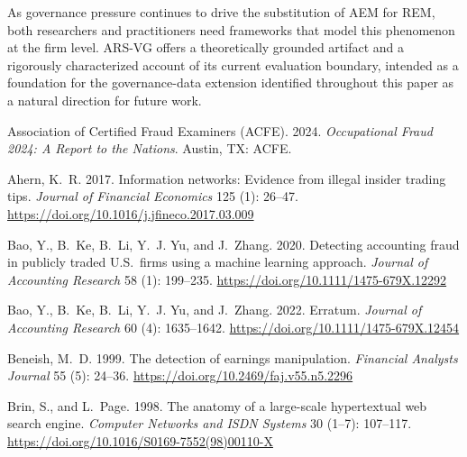 \documentclass[12pt]{article}
\begin{document}
As governance pressure continues to drive the substitution of AEM for REM,
both researchers and practitioners need frameworks that model this phenomenon
at the firm level.  ARS-VG offers a theoretically grounded artifact and
a rigorously characterized account of its current evaluation boundary,
intended as a foundation for the governance-data extension identified
throughout this paper as a natural direction for future work.



\begin{thebibliography}{}

Association of Certified Fraud Examiners (ACFE). 2024.
\newblock \textit{Occupational Fraud 2024: A Report to the Nations}.
\newblock Austin, TX: ACFE.

Ahern, K.~R. 2017.
\newblock Information networks: Evidence from illegal insider trading tips.
\newblock \textit{Journal of Financial Economics} 125 (1): 26--47.
  \url{https://doi.org/10.1016/j.jfineco.2017.03.009}

Bao, Y., B.~Ke, B.~Li, Y.~J. Yu, and J.~Zhang. 2020.
\newblock Detecting accounting fraud in publicly traded U.S.\ firms using a
  machine learning approach.
\newblock \textit{Journal of Accounting Research} 58 (1): 199--235.
  \url{https://doi.org/10.1111/1475-679X.12292}

Bao, Y., B.~Ke, B.~Li, Y.~J. Yu, and J.~Zhang. 2022.
\newblock Erratum.
\newblock \textit{Journal of Accounting Research} 60 (4): 1635--1642.
  \url{https://doi.org/10.1111/1475-679X.12454}

Beneish, M.~D. 1999.
\newblock The detection of earnings manipulation.
\newblock \textit{Financial Analysts Journal} 55 (5): 24--36.
  \url{https://doi.org/10.2469/faj.v55.n5.2296}

Brin, S., and L.~Page. 1998.
\newblock The anatomy of a large-scale hypertextual web search engine.
\newblock \textit{Computer Networks and ISDN Systems} 30 (1--7): 107--117.
  \url{https://doi.org/10.1016/S0169-7552(98)00110-X}


\end{thebibliography}
\end{document}
